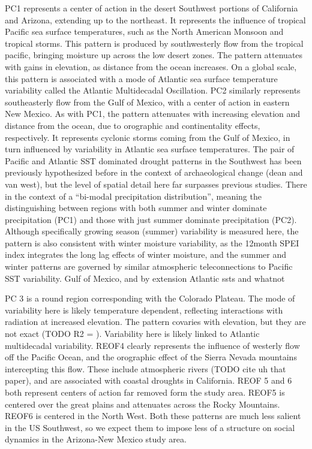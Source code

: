 \documentclass[fleqn,10pt]{wlscirep}
\begin{document}
PC1 represents a center of action in the desert Southwest portions of California and Arizona, extending up to the northeast. It represents the influence of tropical Pacific sea surface temperatures, such as the North American Monsoon and tropical storms. This pattern is produced by southwesterly flow from the tropical pacific, bringing moisture up across the low desert zones. The pattern attenuates with gains in elevation, as distance from the ocean increases. On a global scale, this pattern is associated with a mode of Atlantic sea surface temperature variability called the Atlantic Multidecadal Oscillation. PC2 similarly represents southeasterly flow from the Gulf of Mexico, with a center of action in eastern New Mexico. As with PC1, the pattern attenuates with increasing elevation and distance from the ocean, due to orographic and continentality effects, respectively. It represents cyclonic storms coming from the Gulf of Mexico, in turn influenced by variability in Atlantic sea surface temperatures. The pair of Pacific and Atlantic SST dominated drought patterns in the Southwest has been previously hypothesized before in the context of archaeological change (dean and van west), but the level of spatial detail here far surpasses previous studies. There in the context of a ``bi-modal precipitation distribution'', meaning the distinguishing between regions with both summer and winter dominate precipitation (PC1) and those with just summer dominate precipitation (PC2). Although specifically growing season (summer) variability is measured here, the pattern is also consistent with winter moisture variability, as the 12month SPEI index integrates the long lag effects of winter moisture, and the summer and winter patterns are governed by similar atmospheric teleconnections to Pacific SST variability.
Gulf of Mexico, and by extension Atlantic ssts and whatnot

PC 3 is a round region corresponding with the Colorado Plateau. The mode of variability here is likely temperature dependent, reflecting interactions with radiation at increased elevation. The pattern covaries with elevation, but they are not exact (TODO R2 = ). Variability here is likely linked to Atlantic multidecadal variability. REOF4 clearly represents the influence of westerly flow off the Pacific Ocean, and the orographic effect of the Sierra Nevada mountains intercepting this flow. These include atmospheric rivers (TODO cite uh that paper), and are associated with coastal droughts in California. REOF 5 and 6 both represent centers of action far removed form the study area. REOF5 is centered over the great plains and attenuates across the Rocky Mountains. REOF6 is centered in the North West. Both these patterns are much less salient in the US Southwest, so we expect them to impose less of a structure on social dynamics in the Arizona-New Mexico study area.
\end{document}
